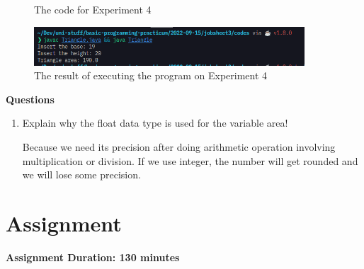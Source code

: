 \documentclass[12pt,titlepage]{article}
\begin{document}
\begin{enumerate}
\begin{figure}[h]
        \caption{The code for Experiment 4}
    \end{figure}
    \begin{figure}[h]
        \centering
        \includegraphics[width=0.9\textwidth]{./images/triangle-output.png}
        \caption{The result of executing the program on Experiment 4}
    \end{figure}
\end{enumerate}
\pagebreak
\textbf{Questions}
\begin{enumerate}
    \item {
        Explain why the float data type is used for the variable area!

        Because we need its precision after doing arithmetic operation involving multiplication or division.
        If we use integer, the number will get rounded and we will lose some precision.
    }
\end{enumerate}
\section{Assignment}
\textbf{Assignment Duration: 130 minutes}
\end{document}
